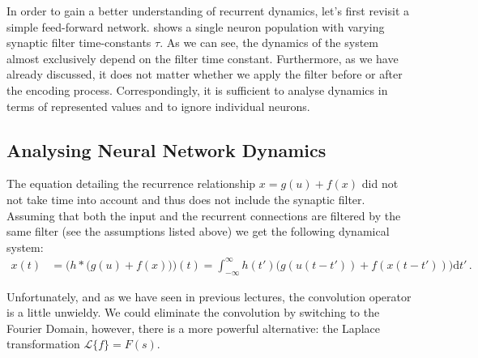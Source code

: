 \documentclass[10pt,letterpaper,oneside]{article}
\begin{document}

In order to gain a better understanding of recurrent dynamics, let's first revisit a simple feed-forward network.  shows a single neuron population with varying synaptic filter time-constants $\tau$. As we can see, the dynamics of the system almost exclusively depend on the filter time constant. Furthermore, as we have already discussed, it does not matter whether we apply the filter before or after the encoding process. Correspondingly, it is sufficient to analyse dynamics in terms of represented values and to ignore individual neurons.


\subsection*{Analysing Neural Network Dynamics}

The equation detailing the recurrence relationship $x = g(u) + f(x)$ did not not take time into account and thus does not include the synaptic filter. Assuming that both the input and the recurrent connections are filtered by the same filter (see the assumptions listed above) we get the following dynamical system:
\begin{align*}
	x(t) &= \big( h \ast \big( g(u) + f(x) \big) \big) (t) = \int_{-\infty}^{\infty} h(t') \big( g(u(t - t')) + f(x(t - t')) \big) \mathrm{d}t' \,.
\end{align*}

Unfortunately, and as we have seen in previous lectures, the convolution operator is a little unwieldy. We could eliminate the convolution by switching to the Fourier Domain, however, there is a more powerful alternative: the Laplace transformation $\mathcal{L}\{f\} = F(s)$.
\end{document}
